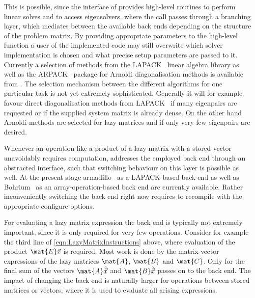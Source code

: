 This is possible, since the interface of \lazyten provides
high-level routines to perform linear solves
and to access eigensolvers,
where the call passes through a branching layer,
which mediates between the available back ends depending on the structure
of the problem matrix.
By providing appropriate parameters to the high-level
function a user of the implemented code may still overwrite
which solver implementation
is chosen and what precise setup parameters are passed to it.
Currently a selection of methods from the LAPACK~\cite{LAPACK}
linear algebra library as well as the ARPACK~\cite{ARPACK} package
for Arnoldi diagonalisation methods is available from \lazyten.
The selection mechanism between the different algorithms
for one particular task is not yet extremely sophisticated.
Generally it will for example favour
direct diagonalisation methods from LAPACK~\cite{LAPACK}
if many eigenpairs are requested
or if the supplied system matrix is already dense.
On the other hand Arnoldi methods are selected for lazy matrices
and if only very few eigenpairs are desired.

Whenever an operation like a product of a lazy matrix
with a stored vector unavoidably requires computation,
\lazyten addresses the employed \LA back end through an abstracted interface,
such that switching behaviour on this layer is possible as well.
At the present stage armadillo~\cite{Armadillo}
as a LAPACK-based back end
as well as Bohrium~\cite{Kristensen2016array,Kristensen2016streaming}
as an array-operation-based back end are currently available.
Rather inconveniently switching the back end
right now requires to recompile \lazyten
with the appropriate configure options.

For evaluating a lazy matrix \contraction expression the \LA back end
is typically not extremely important,
since it is only required for very few operations.
Consider for example the third line of \eqref{eqn:LazyMatrixInstructions} above,
where evaluation of the product $\mat{E}\vec{x}$ is required.
Most work is done by the matrix-vector \contraction expressions
of the lazy matrices $\mat{A}$, $\mat{B}$ and $\mat{C}$.
Only for the final sum of the vectors
$\mat{A} \tilde{\vec{x}}$ and $\mat{B} \tilde{\vec{x}}$
\lazyten passes on to the \LA back end.
The impact of changing the back end is naturally larger for operations
between stored matrices or vectors,
where it is used to evaluate all arising expressions.

